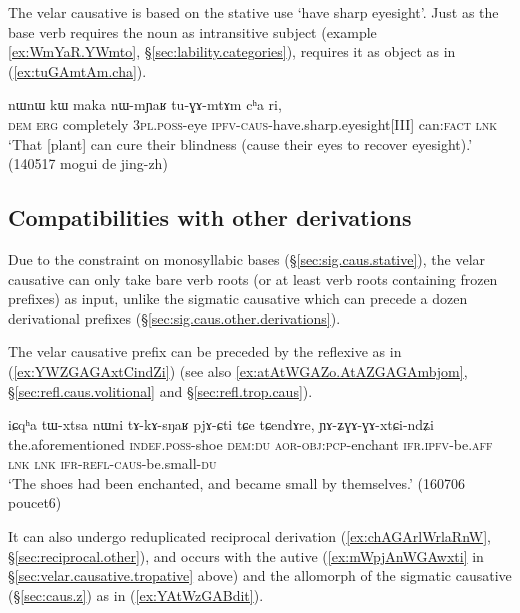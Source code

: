 The velar causative   is based on the stative use `have sharp eyesight'. Just as the base verb requires the noun  as intransitive subject (example \ref{ex:WmYaR.YWmto}, §\ref{sec:lability.categories}),  requires it as object as in (\ref{ex:tuGAmtAm.cha}).

\begin{exe}
\ex \label{ex:tuGAmtAm.cha}
\gll  nɯnɯ kɯ maka nɯ-mɲaʁ tu-ɣɤ-mtɤm cʰa ri, \\
\textsc{dem} \textsc{erg} completely \textsc{3pl}.\textsc{poss}-eye \textsc{ipfv}-\textsc{caus}-have.sharp.eyesight[III] can:\textsc{fact} \textsc{lnk} \\
\glt `That [plant] can cure their blindness (cause their eyes to recover eyesight).' (140517 mogui de jing-zh)
\end{exe} 

\subsection{Compatibilities with other derivations} \label{sec:velar.caus.other}
Due to the constraint on monosyllabic bases (§\ref{sec:sig.caus.stative}), the velar causative can only take bare verb roots (or at least verb roots containing frozen prefixes) as input, unlike the sigmatic causative which can precede a dozen derivational prefixes (§\ref{sec:sig.caus.other.derivations}).

The velar causative prefix can be preceded by the reflexive  as in (\ref{ex:YWZGAGAxtCindZi}) (see also \ref{ex:atAtWGAZo.AtAZGAGAmbjom}, §\ref{sec:refl.caus.volitional} and §\ref{sec:refl.trop.caus}).

\begin{exe}
\ex \label{ex:YWZGAGAxtCindZi}
\gll  iɕqʰa tɯ-xtsa nɯni tɤ-kɤ-sŋaʁ pjɤ-ɕti tɕe tɕendɤre, ɲɤ-ʑɣɤ-ɣɤ-xtɕi-ndʑi \\
the.aforementioned \textsc{indef}.\textsc{poss}-shoe \textsc{dem}:\textsc{du} \textsc{aor}-\textsc{obj}:\textsc{pcp}-enchant \textsc{ifr}.\textsc{ipfv}-be.\textsc{aff} \textsc{lnk} \textsc{lnk} \textsc{ifr}-\textsc{refl}-\textsc{caus}-be.small-\textsc{du} \\
\glt `The shoes had been enchanted, and became small by themselves.' (160706 poucet6)
\end{exe} 

It can also undergo reduplicated reciprocal derivation (\ref{ex:chAGArlWrlaRnW}, §\ref{sec:reciprocal.other}),  and occurs with the autive  (\ref{ex:mWpjAnWGAwxti} in §\ref{sec:velar.causative.tropative} above) and the  allomorph of the sigmatic causative (§\ref{sec:caus.z}) as in (\ref{ex:YAtWzGABdit}).
 
